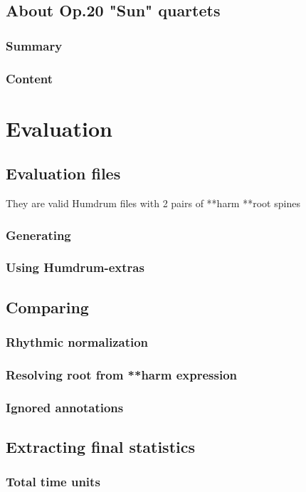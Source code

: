 	\subsection{About Op.20 "Sun" quartets}
		\subsubsection{Summary}
		\subsubsection{Content}
\section{Evaluation}
  \subsection{Evaluation files}
		They are valid Humdrum files with 2 pairs of **harm **root spines
    \subsubsection{Generating}
		\subsubsection{Using Humdrum-extras}
	\subsection{Comparing}
		\subsubsection{Rhythmic normalization}
		\subsubsection{Resolving root from **harm expression}
		\subsubsection{Ignored annotations}
	\subsection{Extracting final statistics}
		\subsubsection{Total time units}
